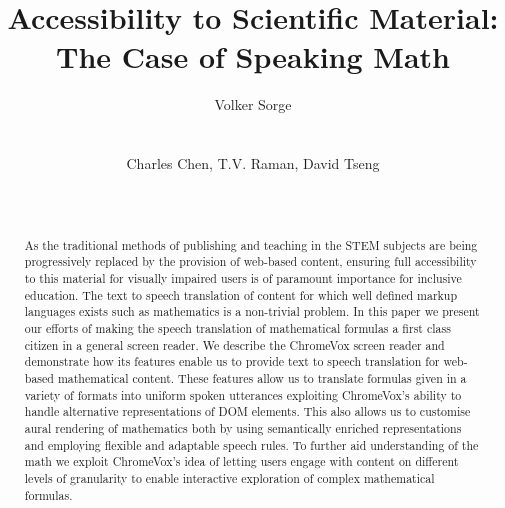 \documentclass{sig-alternate}
\begin{document}
\title{Accessibility to Scientific Material:\\ The Case of Speaking Math}

\author{
%
%
  \alignauthor Volker Sorge\\
  \\
  \\
\alignauthor
Charles Chen, T.V. Raman, David Tseng\\
       \\
       \\
}


\maketitle 
\begin{abstract} 
  As the traditional methods of publishing and teaching in the
  STEM subjects are being progressively replaced by the provision
  of web-based content, ensuring full accessibility to this
  material for visually impaired users is of paramount importance
  for inclusive education. The text to speech translation of
  content for which well defined markup languages exists such as
  mathematics is a non-trivial problem. In this paper we present
  our efforts of making the speech translation of mathematical
  formulas a first class citizen in a general screen reader. We
  describe the ChromeVox screen reader and demonstrate how its
  features enable us to provide text to speech translation for
  web-based mathematical content. These features allow us to
  translate formulas given in a variety of formats into uniform
  spoken utterances exploiting ChromeVox's ability to handle
  alternative representations of DOM elements. This also allows
  us to customise aural rendering of mathematics both by using
  semantically enriched representations and employing flexible
  and adaptable speech rules. To further aid understanding of the
  math we exploit ChromeVox's idea of letting users engage with
  content on different levels of granularity to enable
  interactive exploration of complex mathematical formulas.
\end{abstract}
\end{document}
